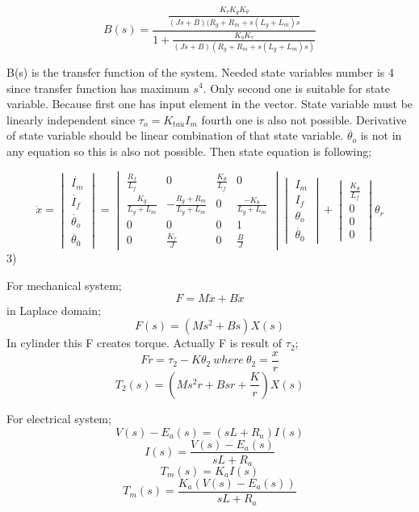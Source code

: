 \documentclass[11pt]{article}
\begin{document}
$$B(s)=\frac{\frac{K_{\tau}K_g K_{\theta}}{(Js+B)(R_g+R_m+s(L_g+L_m)s}}{1+\frac{K_b K_{\tau}}{(Js+B)(R_g+R_m+s(L_g+L_m)s)}}$$

B(s) is the transfer function of the system. Needed state variables number is 4 since transfer function has maximum $s^4$. 
Only second one is suitable for state variable. Because first one has input element in the vector. State variable must be linearly independent since $\tau_o=K_{tau}I_m$ fourth one is also not possible. Derivative of state variable should be linear combination of that state variable. $\dddot{\theta_o}$ is not in any equation so this is also not possible. Then state equation is following;

$$\dot{x}= \begin{vmatrix}
\dot{I_m}\\
\dot{I_f}\\
\dot{\theta_o}\\
\ddot{\theta_0}
\end{vmatrix} =\begin{vmatrix}
\frac{R_f}{L_f} & 0 & \frac{K_{\theta}}{L_f}& 0 \\
\frac{K_g}{L_g+L_m} & -\frac{R_g+R_m}{L_g+L_m} & 0 & \frac{-K_b}{L_g+L_m} \\
0 & 0 & 0 & 1\\
0 & \frac{K_{\tau}}{J} & 0 & \frac{B}{J}
\end{vmatrix} \begin{vmatrix}
I_m\\
I_f\\
\theta_o\\
\dot{\theta_0}
\end{vmatrix} + \begin{vmatrix}
\frac{K_{\theta}}{L_f}\\
0\\
0\\
0
\end{vmatrix}\theta_r$$
3)

For mechanical system; 
$$F=M\ddot{x}+B\dot{x}$$
in Laplace domain;
$$F(s)=(Ms^2+Bs)X(s)$$
In cylinder this F creates torque. Actually F is result of $\tau_2$;
$$Fr=\tau_2-K\theta_2 \> where \> \theta_2=\frac{x}{r}$$
$$T_2(s)=(Ms^2r+Bsr+\frac{K}{r})X(s)$$

For electrical system; 
\[V(s)-E_a(s)=(sL+R_a)I(s)\]
\[I(s)=\frac{V(s)-E_a(s)}{sL+R_a}\]
\[T_m(s)=K_aI(s)\]
\[T_m(s)=\frac{K_a(V(s)-E_a(s))}{sL+R_a}\]
\end{document}
